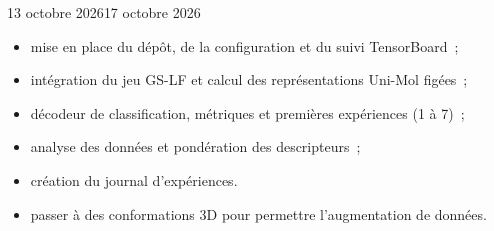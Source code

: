 \begin{fichesuivi}{13 octobre 2026}{17 octobre 2026}

   \begin{travaileffectue}
      \begin{itemize}
         \item mise en place du dépôt, de la configuration et du suivi TensorBoard~;
         \item intégration du jeu GS-LF et calcul des représentations Uni-Mol figées~;
         \item décodeur de classification, métriques et premières expériences (1 à 7)~;
         \item analyse des données et pondération des descripteurs~;
         \item création du journal d'expériences.
      \end{itemize}
   \end{travaileffectue}

   \begin{travailnoneffectue}
   \end{travailnoneffectue}

   \begin{echange}
   \end{echange}

   \begin{planification}
      \begin{itemize}
         \item passer à des conformations 3D pour permettre l'augmentation de données.
      \end{itemize}
   \end{planification}
\end{fichesuivi}

